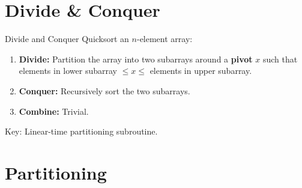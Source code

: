 \documentclass{beamer}
\begin{document}
\section{Divide \& Conquer}

\begin{frame}{Divide and Conquer}
    Quicksort an $n$-element array:
    \begin{enumerate}
        \item \textbf{\Large Divide:} Partition the array into two subarrays around a \textbf{pivot} $x$ such that elements in lower subarray $\leq x \leq$ elements in upper subarray. \pause
             \pause
        \item \textbf{\Large Conquer:} Recursively sort the two subarrays. \pause
        \item \textbf{\Large Combine:} Trivial. \pause
    \end{enumerate}
    \begin{alertblock}{Key:}
        Linear-time partitioning subroutine.
    \end{alertblock}
\end{frame}

\section{Partitioning}
\end{document}

